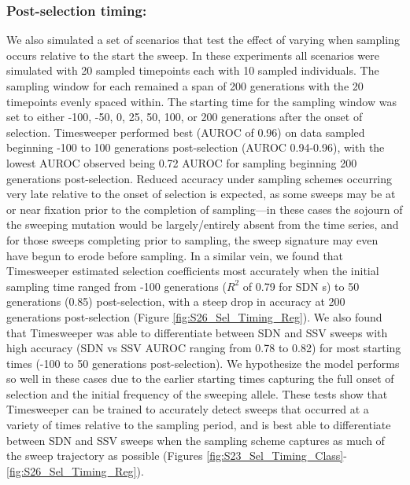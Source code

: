 \subsubsection{Post-selection timing:} We also simulated a set of scenarios that test the effect of varying when sampling occurs relative to the start the sweep. In these experiments all scenarios were simulated with 20 sampled timepoints each with 10 sampled individuals. The sampling window for each remained a span of 200 generations with the 20 timepoints evenly spaced within. The starting time for the sampling window was set to either -100, -50, 0, 25, 50, 100, or 200 generations after the onset of selection. Timesweeper performed best (AUROC of 0.96) on data sampled beginning -100 to 100 generations post-selection (AUROC 0.94-0.96), with the lowest AUROC observed being 0.72 AUROC for sampling beginning 200 generations post-selection. Reduced accuracy under sampling schemes occurring very late relative to the onset of selection is expected, as some sweeps may be at or near fixation prior to the completion of sampling—in these cases the sojourn of the sweeping mutation would be largely/entirely absent from the time series, and for those sweeps completing prior to sampling, the sweep signature may even have begun to erode before sampling. In a similar vein, we found that Timesweeper estimated selection coefficients most accurately when the initial sampling time ranged from -100 generations ($R^2$ of 0.79 for SDN s) to 50 generations (0.85) post-selection, with a steep drop in accuracy at 200 generations post-selection (Figure \ref{fig:S26_Sel_Timing_Reg}).
We also found that Timesweeper was able to differentiate between SDN and SSV sweeps with high accuracy (SDN vs SSV AUROC ranging from 0.78 to 0.82) for most starting times (-100 to 50 generations post-selection). We hypothesize the model performs so well in these cases due to the earlier starting times capturing the full onset of selection and the initial frequency of the sweeping allele. These tests show that Timesweeper can be trained to accurately detect sweeps that occurred at a variety of times relative to the sampling period, and is best able to differentiate between SDN and SSV sweeps when the sampling scheme captures as much of the sweep trajectory as possible (Figures \ref{fig:S23_Sel_Timing_Class}-\ref{fig:S26_Sel_Timing_Reg}). \\

